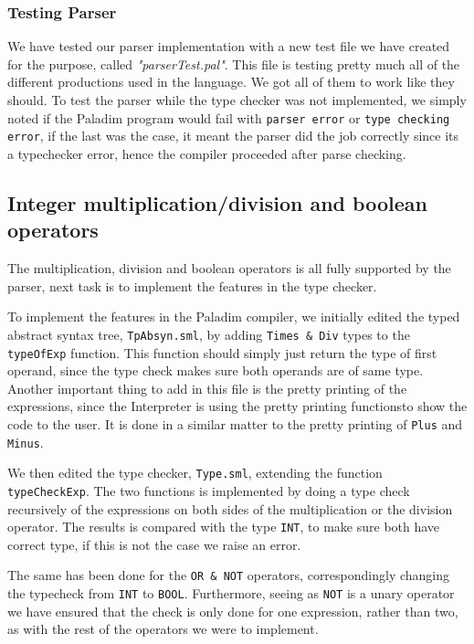 \documentclass[10pt]{article}
\begin{document}
\subsubsection{Testing Parser}
We have tested our parser implementation with a new test file we have created for the purpose, called \textit{"parserTest.pal"}. This file is testing pretty much all of the different productions used in the language. We got all of them to work like they should. To test the parser while the type checker was not implemented, we simply noted if the Paladim program would fail with \texttt{parser error} or \texttt{type checking error}, if the last was the case, it meant the parser did the job correctly since its a typechecker error, hence the compiler proceeded after parse checking.

\subsection{Integer multiplication/division and boolean operators}
The multiplication, division and boolean operators is all fully supported by the parser, next task is to implement the features in the type checker.

To implement the features in the Paladim compiler, we initially edited the typed abstract syntax tree, \texttt{TpAbsyn.sml}, by adding \texttt{Times \& Div} types to the \texttt{typeOfExp} function. This function should simply just return the type of first operand, since the type check makes sure both operands are of same type. Another important thing to add in this file is the pretty printing of the expressions, since the Interpreter is using the pretty printing functionsto show the code to the user. It is done in a similar matter to the pretty printing of \texttt{Plus} and \texttt{Minus}.

We then edited the type checker, \texttt{Type.sml}, extending the function \texttt{typeCheckExp}. The two functions is implemented by doing a type check recursively of the expressions on both sides of the multiplication or the division operator. The results is compared with the type \texttt{INT}, to make sure both have correct type, if this is not the case we raise an error.

The same has been done for the \texttt{OR \& NOT} operators, correspondingly changing the typecheck from \texttt{INT} to \texttt{BOOL}. Furthermore, seeing as \texttt{NOT} is a unary operator we have ensured that the check is only done for one expression, rather than two, as with the rest of the operators we were to implement.
\end{document}
